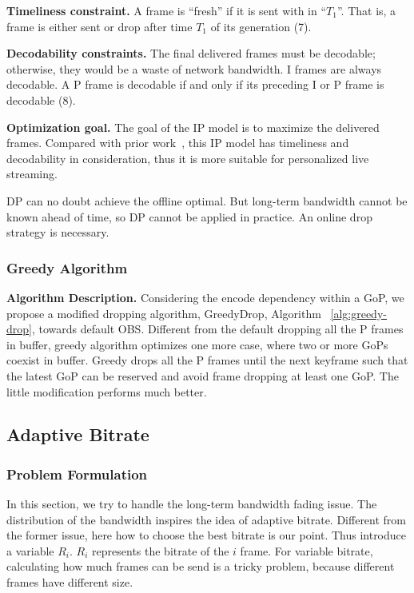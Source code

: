 \textbf{Timeliness constraint.}
A frame is ``fresh'' if it is sent with in ``$T_1$''. That is, a frame is either sent or drop after time $T_1$ of its generation (7).

\textbf{Decodability constraints.} The final delivered frames must be decodable; otherwise, they would be a waste of network bandwidth. I frames are always decodable. A P frame is decodable if and only if its preceding I or P frame is decodable (8).

\textbf{Optimization goal.} The goal of the IP model is to maximize the delivered frames.
Compared with prior work~\cite{singh2004dynamic}, this IP model has timeliness and decodability in consideration, thus it is more suitable for personalized live streaming.

DP can no doubt achieve the offline optimal. But long-term bandwidth cannot be known ahead of time, so DP cannot be applied in practice. An online drop strategy is necessary.

\subsubsection{Greedy Algorithm}

\textbf{Algorithm Description.} Considering the encode dependency within a GoP, we propose a modified dropping algorithm, GreedyDrop, Algorithm ~\ref{alg:greedy-drop}, towards default OBS. Different from the
default dropping all the P frames in buffer, greedy algorithm optimizes one more case, where two or more GoPs coexist in buffer. Greedy drops all the P frames until the next keyframe such that the latest GoP can be reserved and avoid frame dropping at least one GoP. The little modification performs much better.

\subsection{Adaptive Bitrate}
\subsubsection{Problem Formulation}


In this section, we try to handle the long-term bandwidth fading issue. The distribution of the bandwidth inspires the idea of adaptive bitrate. Different from the former issue, here how to choose the best bitrate is our point. Thus introduce a variable $R_{i}$. $R_{i}$ represents the bitrate of the $i$ frame. For variable bitrate, calculating how much frames can be send is a tricky problem, because different frames have different size.

